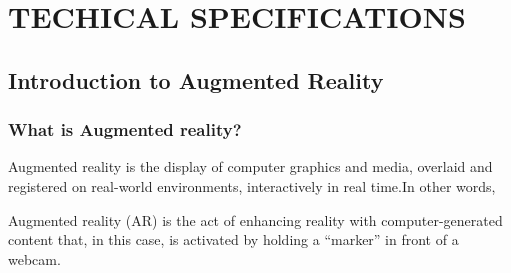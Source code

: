 \documentclass{article}
\begin{document}

\newpage
\section{TECHICAL SPECIFICATIONS}

\subsection{Introduction to Augmented Reality }

\subsubsection{What is Augmented reality? }
\par Augmented reality is the display of computer graphics and media, overlaid and registered on real-world environments, interactively in real time.{\small{In other words,}}
\par Augmented reality (AR) is the act of enhancing reality with computer-generated content that, in this case, is activated by holding a “marker” in front of a webcam.
\end{document}
